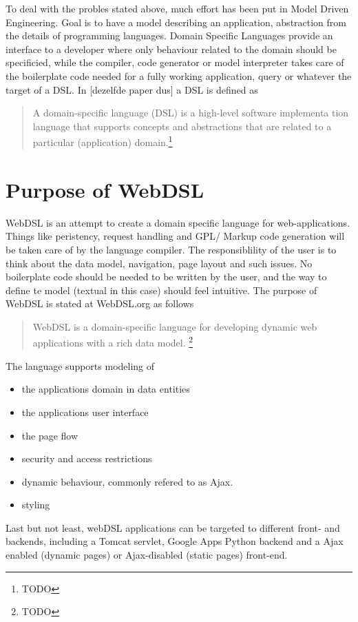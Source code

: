 To deal with the probles stated above, much effort has been put in Model Driven Engineering. Goal is to have a model describing an application, abstraction from the details of programming languages. Domain Specific Languages provide an interface to a developer where only behaviour related to the domain should be specificied, while the compiler, code generator or model interpreter takes care of the boilerplate code needed for a fully working application, query or whatever the target of a DSL. In [dezelfde paper dus] a DSL is defined as
\begin{quote}
A domain-specific language (DSL) is a high-level software implementa
tion language that supports concepts and abstractions that are related
to a particular (application) domain.\footnote{TODO}
\end{quote}
\section[]{Purpose of WebDSL}
WebDSL is an attempt to create a domain specific language for web-applications. Things like peristency, request handling and GPL/ Markup code generation will be taken care of by the language compiler. The responsiblility of the user is to think about the data model, navigation, page layout and such issues. No boilerplate code should be needed to be written by the user, and the way to define te model (textual in this case) should feel intuitive. The purpose of WebDSL is stated at WebDSL.org as follows
\begin{quote}
WebDSL is a domain-specific language for developing dynamic web applications with a rich data model.
\footnote{TODO}
\end{quote}

The language supports modeling of
\begin{itemize}
	\item the applications domain in data entities
	\item the applications user interface
	\item the page flow
	\item security and access restrictions
	\item dynamic behaviour, commonly refered to as Ajax. 
	\item styling
\end{itemize}

 
Last but not least, webDSL applications can be targeted to different front- and backends, including a Tomcat servlet, Google Apps Python backend and a Ajax enabled (dynamic pages) or Ajax-disabled (static pages) front-end. 

